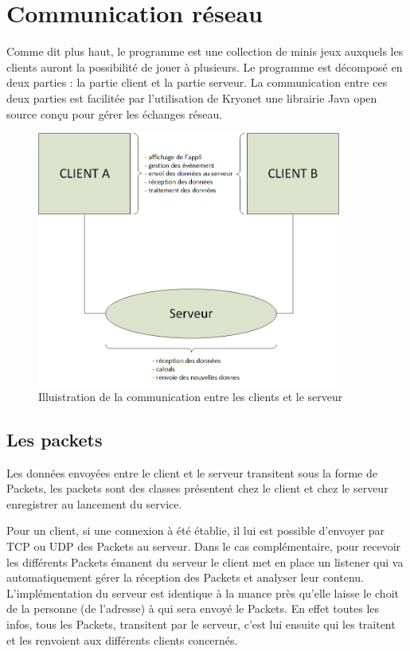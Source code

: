 \documentclass{report}
\begin{document}
\chapter{Communication réseau}
Comme dit plus haut, le programme est une collection de minis jeux auxquels les clients auront la possibilité de jouer à
plusieurs. Le programme est décomposé en deux parties : la partie client et la partie serveur. La communication entre ces
deux parties est facilitée par l'utilisation de Kryonet une librairie Java open source conçu pour gérer les échanges réseau.

\begin{figure}[H]
	\centering\includegraphics[width=10cm]{maquette_Base}
	\caption{Illuistration de la communication entre les clients et le serveur}
\end{figure}


\section{Les packets}
Les données envoyées entre le client et le serveur transitent sous la forme de Packets, les packets sont des classes présentent
chez le client et chez le serveur enregistrer au lancement du service.

Pour un client, si une connexion à été établie, il lui est possible d'envoyer par
TCP ou UDP des Packets au serveur. Dans le cas complémentaire,
pour recevoir les différents Packets émanent du serveur le client met en place
un listener qui va automatiquement gérer la réception des Packets et analyser leur contenu.
L'implémentation du serveur est identique à la nuance près qu'elle laisse le choit
de la personne (de l'adresse) à qui sera envoyé le Packets. En effet toutes les infos, tous les Packets,
transitent par le serveur, c'est lui ensuite qui les traitent et les renvoient aux différents clients concernés.
\end{document}
